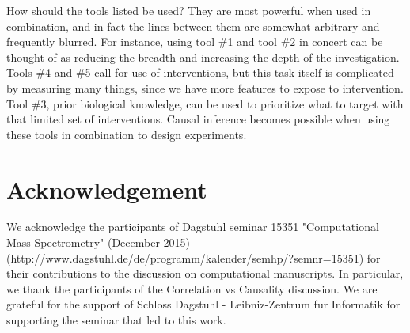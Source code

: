 \documentclass[journal=jacsat,manuscript=article]{achemso}
\begin{document}
How should the tools listed be used? They are most powerful when used in
combination, and in fact the lines between them are somewhat arbitrary
and frequently blurred. For instance, using tool \#1 and tool \#2 in
concert can be thought of as reducing the breadth and increasing the
depth of the investigation. Tools \#4 and \#5 call for use of
interventions, but this task itself is complicated by measuring many
things, since we have more features to expose to intervention. Tool
\#3, prior biological knowledge, can be used to prioritize what to
target with that limited set of interventions.  Causal inference becomes possible when using these tools in combination to design experiments.

\section{Acknowledgement}
We acknowledge the participants of Dagstuhl seminar 15351 "Computational Mass Spectrometry" (December 2015) (http://www.dagstuhl.de/de/programm/kalender/semhp/?semnr=15351) for their contributions to the discussion on computational manuscripts. In particular, we thank the participants of the Correlation vs Causality discussion. We are grateful for the support of Schloss Dagstuhl - Leibniz-Zentrum fur Informatik for supporting the seminar that led to this work.
\end{document}
